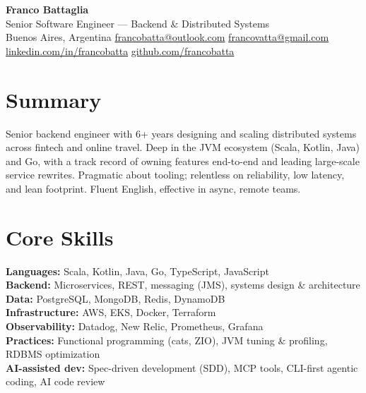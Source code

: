 \documentclass[11pt,a4paper]{article}
\begin{document}
\begin{center}
  {\Huge\bfseries Franco Battaglia}\\[3pt]
  {\large\color{accent}Senior Software Engineer — Backend \& Distributed Systems}\\[4pt]
  {\small
    Buenos Aires, Argentina \quad\textbullet\quad
    \href{mailto:francobatta@outlook.com}{francobatta@outlook.com} \quad\textbullet\quad
    \href{mailto:francovatta@gmail.com}{francovatta@gmail.com}\\[2pt]
    \href{https://linkedin.com/in/francobatta}{linkedin.com/in/francobatta} \quad\textbullet\quad
    \href{https://github.com/francobatta}{github.com/francobatta}
  }
\end{center}
\vspace{2pt}

\section{Summary}
Senior backend engineer with 6+ years designing and scaling distributed systems across
fintech and online travel. Deep in the JVM ecosystem (Scala, Kotlin, Java) and Go, with a
track record of owning features end-to-end and leading large-scale service rewrites.
Pragmatic about tooling; relentless on reliability, low latency, and lean footprint. Fluent
English, effective in async, remote teams.

\section{Core Skills}
\textbf{Languages:} Scala, Kotlin, Java, Go, TypeScript, JavaScript\\
\textbf{Backend:} Microservices, REST, messaging (JMS), systems design \& architecture\\
\textbf{Data:} PostgreSQL, MongoDB, Redis, DynamoDB\\
\textbf{Infrastructure:} AWS, EKS, Docker, Terraform\\
\textbf{Observability:} Datadog, New Relic, Prometheus, Grafana\\
\textbf{Practices:} Functional programming (cats, ZIO), JVM tuning \& profiling, RDBMS optimization\\
\textbf{AI-assisted dev:} Spec-driven development (SDD), MCP tools, CLI-first agentic coding, AI code review
\end{document}
